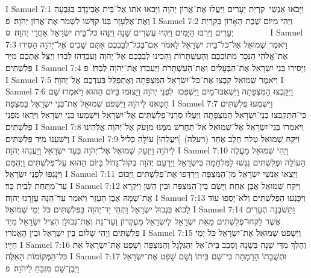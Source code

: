 I Samuel 7:1	וַיָּבֹאוּ אַנְשֵׁי  קִרְיַת יְעָרִים וַיַּעֲלוּ אֶת־אֲרוֹן יְהֹוָה וַיָּבִאוּ אֹתוֹ אֶל־בֵּית אֲבִינָדָב בַּגִּבְעָה וְאֶת־אֶלְעָזָר בְּנוֹ קִדְּשׁוּ לִשְׁמֹר אֶת־אֲרוֹן יְהֹוָה׃ {פ}
I Samuel 7:2	וַיְהִי מִיּוֹם שֶׁבֶת הָאָרוֹן בְּקִרְיַת יְעָרִים וַיִּרְבּוּ הַיָּמִים וַיִּהְיוּ עֶשְׂרִים שָׁנָה וַיִּנָּהוּ כּל־בֵּית יִשְׂרָאֵל אַחֲרֵי יְהֹוָה׃ {ס}        
I Samuel 7:3	וַיֹּאמֶר שְׁמוּאֵל אֶל־כּל־בֵּית יִשְׂרָאֵל לֵאמֹר אִם־בְּכל־לְבַבְכֶם אַתֶּם שָׁבִים אֶל־יְהֹוָה הָסִירוּ אֶת־אֱלֹהֵי הַנֵּכָר מִתּוֹכְכֶם וְהָעַשְׁתָּרוֹת וְהָכִינוּ לְבַבְכֶם אֶל־יְהֹוָה וְעִבְדֻהוּ לְבַדּוֹ וְיַצֵּל אֶתְכֶם מִיַּד פְּלִשְׁתִּים׃
I Samuel 7:4	וַיָּסִירוּ בְּנֵי יִשְׂרָאֵל אֶת־הַבְּעָלִים וְאֶת־הָעַשְׁתָּרֹת וַיַּעַבְדוּ אֶת־יְהֹוָה לְבַדּוֹ׃ {פ}
I Samuel 7:5	וַיֹּאמֶר שְׁמוּאֵל קִבְצוּ אֶת־כּל־יִשְׂרָאֵל הַמִּצְפָּתָה וְאֶתְפַּלֵּל בַּעַדְכֶם אֶל־יְהֹוָה׃
I Samuel 7:6	וַיִּקָּבְצוּ הַמִּצְפָּתָה וַיִּשְׁאֲבוּ־מַיִם וַיִּשְׁפְּכוּ  לִפְנֵי יְהֹוָה וַיָּצוּמוּ בַּיּוֹם הַהוּא וַיֹּאמְרוּ שָׁם חָטָאנוּ לַיהֹוָה וַיִּשְׁפֹּט שְׁמוּאֵל אֶת־בְּנֵי יִשְׂרָאֵל בַּמִּצְפָּה׃
I Samuel 7:7	וַיִּשְׁמְעוּ פְלִשְׁתִּים כִּי־הִתְקַבְּצוּ בְנֵי־יִשְׂרָאֵל הַמִּצְפָּתָה וַיַּעֲלוּ סַרְנֵי־פְלִשְׁתִּים אֶל־יִשְׂרָאֵל וַיִּשְׁמְעוּ בְּנֵי יִשְׂרָאֵל וַיִּרְאוּ מִפְּנֵי פְלִשְׁתִּים׃
I Samuel 7:8	וַיֹּאמְרוּ בְנֵי־יִשְׂרָאֵל אֶל־שְׁמוּאֵל אַל־תַּחֲרֵשׁ מִמֶּנּוּ מִזְּעֹק אֶל־יְהֹוָה אֱלֹהֵינוּ וְיֹשִׁעֵנוּ מִיַּד פְּלִשְׁתִּים׃
I Samuel 7:9	וַיִּקַּח שְׁמוּאֵל טְלֵה חָלָב אֶחָד (ויעלה) [וַיַּעֲלֵהוּ] עוֹלָה כָּלִיל לַיהֹוָה וַיִּזְעַק שְׁמוּאֵל אֶל־יְהֹוָה בְּעַד יִשְׂרָאֵל וַיַּעֲנֵהוּ יְהֹוָה׃
I Samuel 7:10	וַיְהִי שְׁמוּאֵל מַעֲלֶה הָעוֹלָה וּפְלִשְׁתִּים נִגְּשׁוּ לַמִּלְחָמָה בְּיִשְׂרָאֵל וַיַּרְעֵם יְהֹוָה בְּקוֹל־גָּדוֹל בַּיּוֹם הַהוּא עַל־פְּלִשְׁתִּים וַיְהֻמֵּם וַיִּנָּגְפוּ לִפְנֵי יִשְׂרָאֵל׃
I Samuel 7:11	וַיֵּצְאוּ אַנְשֵׁי יִשְׂרָאֵל מִן־הַמִּצְפָּה וַיִּרְדְּפוּ אֶת־פְּלִשְׁתִּים וַיַּכּוּם עַד־מִתַּחַת לְבֵית כָּר׃
I Samuel 7:12	וַיִּקַּח שְׁמוּאֵל אֶבֶן אַחַת וַיָּשֶׂם בֵּין־הַמִּצְפָּה וּבֵין הַשֵּׁן וַיִּקְרָא אֶת־שְׁמָהּ אֶבֶן הָעָזֶר וַיֹּאמַר עַד־הֵנָּה עֲזָרָנוּ יְהֹוָה׃
I Samuel 7:13	וַיִּכָּנְעוּ הַפְּלִשְׁתִּים וְלֹא־יָסְפוּ עוֹד לָבוֹא בִּגְבוּל יִשְׂרָאֵל וַתְּהִי יַד־יְהֹוָה בַּפְּלִשְׁתִּים כֹּל יְמֵי שְׁמוּאֵל׃
I Samuel 7:14	וַתָּשֹׁבְנָה הֶעָרִים אֲשֶׁר לָקְחוּ־פְלִשְׁתִּים מֵאֵת יִשְׂרָאֵל  לְיִשְׂרָאֵל מֵעֶקְרוֹן וְעַד־גַּת וְאֶת־גְּבוּלָן הִצִּיל יִשְׂרָאֵל מִיַּד פְּלִשְׁתִּים וַיְהִי שָׁלוֹם בֵּין יִשְׂרָאֵל וּבֵין הָאֱמֹרִי׃
I Samuel 7:15	וַיִּשְׁפֹּט שְׁמוּאֵל אֶת־יִשְׂרָאֵל כֹּל יְמֵי חַיָּיו׃
I Samuel 7:16	וְהָלַךְ מִדֵּי שָׁנָה בְּשָׁנָה וְסָבַב בֵּית־אֵל וְהַגִּלְגָּל וְהַמִּצְפָּה וְשָׁפַט אֶת־יִשְׂרָאֵל אֵת כּל־הַמְּקוֹמוֹת הָאֵלֶּה׃
I Samuel 7:17	וּתְשֻׁבָתוֹ הָרָמָתָה כִּי־שָׁם בֵּיתוֹ וְשָׁם שָׁפָט אֶת־יִשְׂרָאֵל וַיִּבֶן־שָׁם מִזְבֵּחַ לַיהֹוָה׃ {פ}
